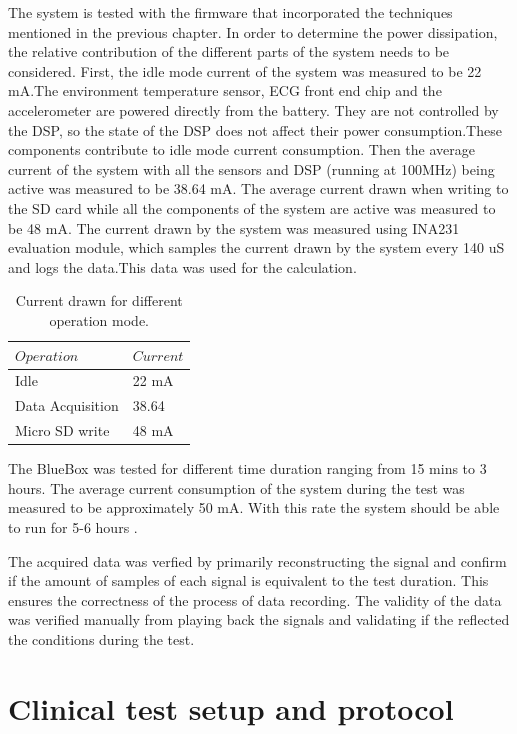 The system is tested with the firmware that incorporated the techniques mentioned in the previous chapter. 
In order to determine the  power dissipation, the relative contribution of the different parts of the system needs to be considered.  First, the idle mode current of the system was measured to be 22 mA.The environment temperature sensor, ECG front end chip and the accelerometer are  powered directly from the battery. They are not controlled by the DSP, so the state of the DSP does not affect their power consumption.These components contribute to idle mode current consumption. Then the average current of the system with all the sensors and DSP (running at 100MHz) being active was measured to be 38.64 mA. The average current drawn when writing to the SD card while all the components of the system are active was measured to be 48 mA. The current drawn by the system was measured using INA231 evaluation module, which samples the current drawn by the system  every 140 uS and logs the data.This data was used for the calculation.
\begin{table}[h]
	\centering
	\begin{tabular}{|l|l|}
		\hline
		$Operation$ & $Current$\\
		\hline
		Idle &  22 mA\\
		Data Acquisition &  38.64\\
		Micro SD write & 48 mA \\
		\hline
	\end{tabular}
	\caption{Current drawn for different operation mode.}
	\label{table:ecg}
\end{table}

The BlueBox was tested for different time duration ranging from 15 mins to 3 hours. The average current consumption of the system during the test was measured to be approximately 50 mA. With this rate the system should be able to run for 5-6 hours .

The acquired data was verfied by primarily reconstructing the signal and confirm if the amount of samples of each signal is equivalent to the test duration. This ensures the correctness of the process of data recording. The validity of the data was verified manually from playing back the signals and validating if the reflected the conditions during the test.
\section{Clinical test setup and protocol}

